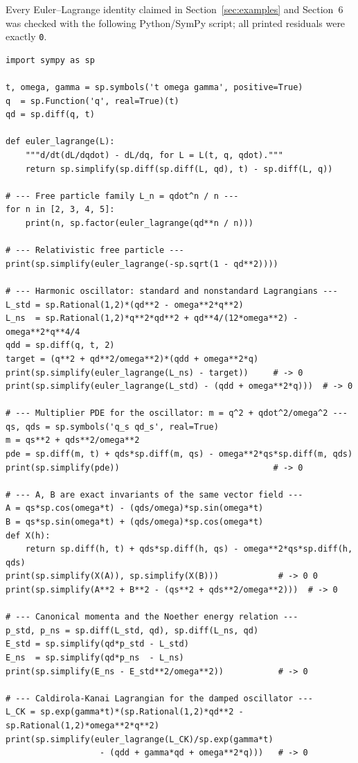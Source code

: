 \documentclass[11pt]{article}
\theoremstyle{remark}
\begin{document}
Every Euler--Lagrange identity claimed in Section~\ref{sec:examples} and Section~6 was checked with the following Python/SymPy script; all printed residuals were exactly \texttt{0}.

{\small
\begin{verbatim}
import sympy as sp

t, omega, gamma = sp.symbols('t omega gamma', positive=True)
q  = sp.Function('q', real=True)(t)
qd = sp.diff(q, t)

def euler_lagrange(L):
    """d/dt(dL/dqdot) - dL/dq, for L = L(t, q, qdot)."""
    return sp.simplify(sp.diff(sp.diff(L, qd), t) - sp.diff(L, q))

# --- Free particle family L_n = qdot^n / n ---
for n in [2, 3, 4, 5]:
    print(n, sp.factor(euler_lagrange(qd**n / n)))

# --- Relativistic free particle ---
print(sp.simplify(euler_lagrange(-sp.sqrt(1 - qd**2))))

# --- Harmonic oscillator: standard and nonstandard Lagrangians ---
L_std = sp.Rational(1,2)*(qd**2 - omega**2*q**2)
L_ns  = sp.Rational(1,2)*q**2*qd**2 + qd**4/(12*omega**2) - omega**2*q**4/4
qdd = sp.diff(q, t, 2)
target = (q**2 + qd**2/omega**2)*(qdd + omega**2*q)
print(sp.simplify(euler_lagrange(L_ns) - target))     # -> 0
print(sp.simplify(euler_lagrange(L_std) - (qdd + omega**2*q)))  # -> 0

# --- Multiplier PDE for the oscillator: m = q^2 + qdot^2/omega^2 ---
qs, qds = sp.symbols('q_s qd_s', real=True)
m = qs**2 + qds**2/omega**2
pde = sp.diff(m, t) + qds*sp.diff(m, qs) - omega**2*qs*sp.diff(m, qds)
print(sp.simplify(pde))                               # -> 0

# --- A, B are exact invariants of the same vector field ---
A = qs*sp.cos(omega*t) - (qds/omega)*sp.sin(omega*t)
B = qs*sp.sin(omega*t) + (qds/omega)*sp.cos(omega*t)
def X(h):
    return sp.diff(h, t) + qds*sp.diff(h, qs) - omega**2*qs*sp.diff(h, qds)
print(sp.simplify(X(A)), sp.simplify(X(B)))            # -> 0 0
print(sp.simplify(A**2 + B**2 - (qs**2 + qds**2/omega**2)))  # -> 0

# --- Canonical momenta and the Noether energy relation ---
p_std, p_ns = sp.diff(L_std, qd), sp.diff(L_ns, qd)
E_std = sp.simplify(qd*p_std - L_std)
E_ns  = sp.simplify(qd*p_ns  - L_ns)
print(sp.simplify(E_ns - E_std**2/omega**2))           # -> 0

# --- Caldirola-Kanai Lagrangian for the damped oscillator ---
L_CK = sp.exp(gamma*t)*(sp.Rational(1,2)*qd**2 - sp.Rational(1,2)*omega**2*q**2)
print(sp.simplify(euler_lagrange(L_CK)/sp.exp(gamma*t)
                   - (qdd + gamma*qd + omega**2*q)))   # -> 0
\end{verbatim}
}
\end{document}
